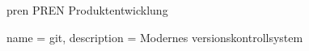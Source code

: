 \newacronym
  {pren}                %
  {PREN}                %
  {Produktentwicklung}  %

{
  name = git,
  description = {
    Modernes versionskontrollsystem
  }
}